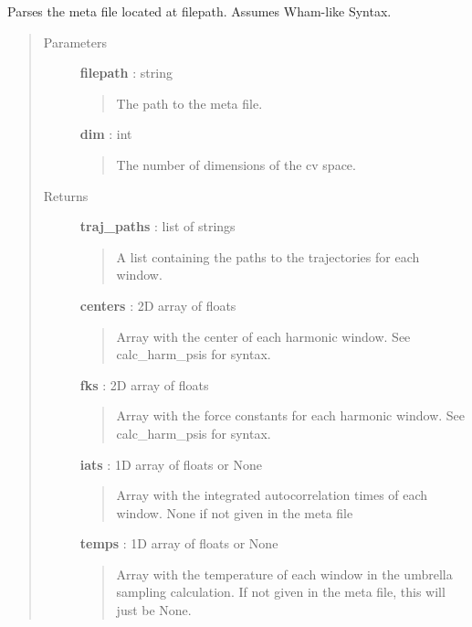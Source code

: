 \documentclass[letterpaper,10pt,english]{sphinxmanual}
\begin{document}

\begin{fulllineitems}
\label{modules/usutils:usutils.parse_metafile}
Parses the meta file located at filepath. Assumes Wham-like Syntax.
\begin{quote}\begin{description}
\item[{Parameters}] \leavevmode
\textbf{filepath} : string
\begin{quote}

The path to the meta file.
\end{quote}

\textbf{dim} : int
\begin{quote}

The number of dimensions of the cv space.
\end{quote}

\item[{Returns}] \leavevmode
\textbf{traj\_paths} : list of strings
\begin{quote}

A list containing the paths to the trajectories for each window.
\end{quote}

\textbf{centers} : 2D array of floats
\begin{quote}

Array with the center of each harmonic window. See calc\_harm\_psis for syntax.
\end{quote}

\textbf{fks} : 2D array of floats
\begin{quote}

Array with the force constants for each harmonic window. See calc\_harm\_psis for syntax.
\end{quote}

\textbf{iats} : 1D array of floats or None
\begin{quote}

Array with the integrated autocorrelation times of each window.  None if not given in 
the meta file
\end{quote}

\textbf{temps} : 1D array of floats or None
\begin{quote}

Array with the temperature of each window in the umbrella sampling calculation.  If not given in the meta file, this will just be None.
\end{quote}

\end{description}\end{quote}

\end{fulllineitems}
\end{document}
